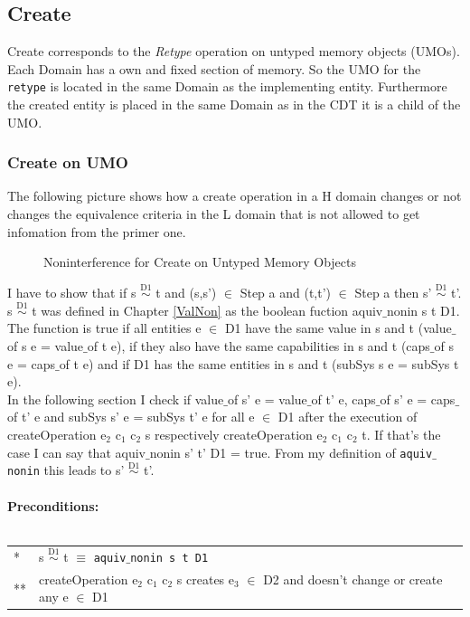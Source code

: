 \documentclass[11pt,a4paper,twoside]{article}
\begin{document}
{\subsection{Create}\label{sec:Create}
Create corresponds to the \textit{Retype} operation on untyped memory objects (UMOs). Each Domain has a own and fixed section of memory. So the UMO for the \texttt{retype} is located in the same Domain as the implementing entity. Furthermore the created entity is placed in the same Domain as in the CDT it is a child of the UMO.  
\subsubsection{Create on UMO}
The following picture shows how a create operation in a H domain changes or not changes the equivalence criteria in the L domain that is not allowed to get infomation from the primer one.
\begin{flushleft}
\begin{figure}[H]
\caption{Noninterference for Create on Untyped Memory Objects}
\end{figure}
\end{flushleft}
I have to show that if s $\overset{\text{D1}}{\sim}$ t and (s,s') $\in$ Step a and (t,t') $\in$ Step a then s' $\overset{\text{D1}}{\sim}$ t'. 
s $\overset{\text{D1}}{\sim}$ t was defined in Chapter \ref{ValNon} as the boolean fuction aquiv$\_$nonin s t D1. The function is true if all entities e $\in$ D1 have the same value in s and t (value$\_$of s e = value$\_$of t e), if they also have the same capabilities in s and t (caps$\_$of s e = caps$\_$of t e) and if D1 has the same entities in s and t (subSys s e = subSys t e).\\
In the following section I check if value$\_$of s' e = value$\_$of t' e, caps$\_$of s' e = caps$\_$of t’ e and subSys s' e = subSys t' e for all e $\in$ D1 after the execution of 
createOperation e$_2$ c$_1$ c$_2$ s respectively createOperation e$_2$ c$_1$ c$_2$ t. If that's the case I can say that aquiv$\_$nonin s' t' D1 = true. From my definition of \texttt{aquiv$\_$nonin} this leads to s' $\overset{\text{D1}}{\sim}$ t'. \\ \\
\textbf{Preconditions:} \\ \\
\begin{tabular}{ll}
* & s $\overset{\text{D1}}{\sim}$ t $\equiv$ \texttt{aquiv$\_$nonin s t D1}	\\ 
** & createOperation e$_2$ c$_1$ c$_2$ s creates e$_3$ $\in$ D2 and doesn't change or create any e $\in$ D1 \\

\end{tabular}}
\end{document}
